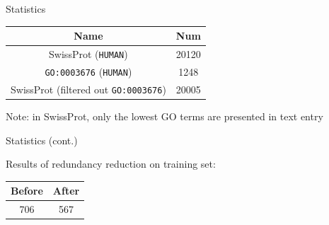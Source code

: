 \documentclass[pdf]
{beamer}
\begin{document}
\begin{frame}{Statistics}
	\begin{center}
		\begin{tabular}{| c | c |}
			\hline
			Name & Num\\
			\hline
			SwissProt (\texttt{HUMAN}) & 20120\\
			\texttt{GO:0003676} (\texttt{HUMAN}) & 1248\\
			SwissProt (filtered out \texttt{GO:0003676}) & 20005 \\
			\hline
		\end{tabular}	
	\end{center}
	
	Note: in SwissProt, only the lowest GO terms are presented in text entry
\end{frame}
	
\begin{frame}{Statistics (cont.)}

	Results of redundancy reduction on training set:\\
	\begin{center}
		\begin{tabular}{| c | c |}
			\hline
			Before & After\\
			\hline
			706 & 567\\
			\hline
		\end{tabular}		
	\end{center}
	
\end{frame}
\end{document}
